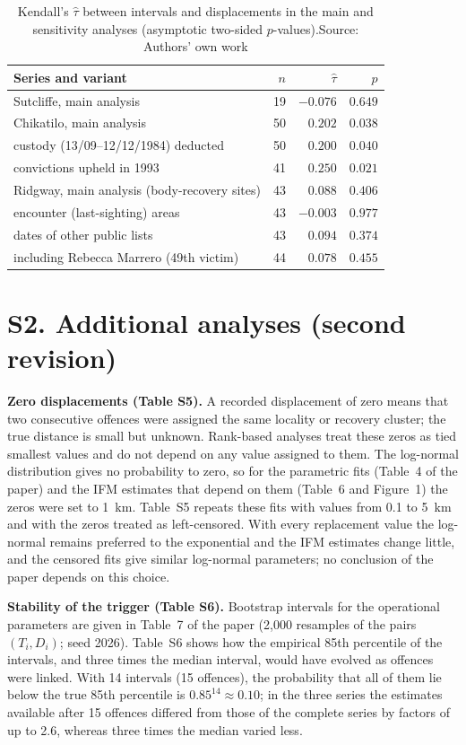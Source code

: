 \documentclass[11pt,a4paper]{article}
\begin{document}
\begin{table}[htbp]
\centering\small
\caption{Kendall's $\hat\tau$ between intervals and displacements in the main and sensitivity analyses (asymptotic two-sided $p$-values).\newline Source: Authors' own work}
\begin{tabular}{lrrr}
\toprule
Series and variant & $n$ & $\hat\tau$ & $p$\\
\midrule
Sutcliffe, main analysis & 19 & $-0.076$ & $0.649$\\
Chikatilo, main analysis & 50 & $0.202$ & $0.038$\\
\quad custody (13/09--12/12/1984) deducted & 50 & $0.200$ & $0.040$\\
\quad 43 convictions upheld in 1993 & 41 & $0.250$ & $0.021$\\
Ridgway, main analysis (body-recovery sites) & 43 & $0.088$ & $0.406$\\
\quad encounter (last-sighting) areas & 43 & $-0.003$ & $0.977$\\
\quad dates of other public lists & 43 & $0.094$ & $0.374$\\
\quad including Rebecca Marrero (49th victim) & 44 & $0.078$ & $0.455$\\
\bottomrule
\end{tabular}
\end{table}

\section*{S2. Additional analyses (second revision)}
\textbf{Zero displacements (Table S5).} A recorded displacement of zero means that two consecutive offences were assigned the same locality or recovery cluster; the true distance is small but unknown. Rank-based analyses treat these zeros as tied smallest values and do not depend on any value assigned to them. The log-normal distribution gives no probability to zero, so for the parametric fits (Table~4 of the paper) and the IFM estimates that depend on them (Table~6 and Figure~1) the zeros were set to 1~km. Table~S5 repeats these fits with values from 0.1 to 5~km and with the zeros treated as left-censored. With every replacement value the log-normal remains preferred to the exponential and the IFM estimates change little, and the censored fits give similar log-normal parameters; no conclusion of the paper depends on this choice.

\textbf{Stability of the trigger (Table S6).} Bootstrap intervals for the operational parameters are given in Table~7 of the paper (2,000 resamples of the pairs $(T_i,D_i)$; seed 2026). Table~S6 shows how the empirical 85th percentile of the intervals, and three times the median interval, would have evolved as offences were linked. With 14 intervals (15 offences), the probability that all of them lie below the true 85th percentile is $0.85^{14}\approx0.10$; in the three series the estimates available after 15 offences differed from those of the complete series by factors of up to 2.6, whereas three times the median varied less.
\end{document}
